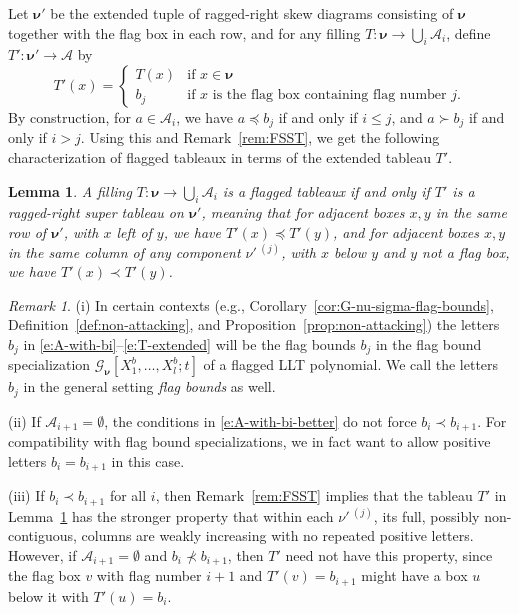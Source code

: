 \documentclass[12pt]{amsart}
\newtheorem{lemma}[thm]{Lemma}
\theoremstyle{definition}
\theoremstyle{remark}
\newtheorem{remark}[thm]{Remark}
\newcommand{\nubold}{{\boldsymbol \nu }}
\newcommand{\Acal}{{\mathcal A}}
\newcommand{\Gcal}{{\mathcal G}}
\newcommand{\sgngt}{\succ}
\newcommand{\sgnlt}{\prec}
\newcommand{\sgnle}{\preccurlyeq}
\begin{document}
Let $\nubold '$ be the extended tuple of ragged-right skew diagrams
consisting of $\nubold $ together with the flag box in each row, and
for any filling $T\colon \nubold \rightarrow \bigcup _{i}\Acal _{i}$,
define $T'\colon \nubold '\rightarrow \Acal $ by
\begin{equation}\label{e:T-extended}
T'(x)=\begin{cases}
T(x)&	\text{if $x \in \nubold$}\\
b_{j}&	\text{if $x$ is the flag box containing flag number $j$}.
\end{cases}
\end{equation}
By construction, for $a\in \Acal _{i}$, we have $a \sgnle b_{j}$ if
and only if $i\leq j$, and $a \sgngt b_{j}$ if and only if $i>j$.
Using this and Remark~\ref{rem:FSST}, we get the following
characterization of flagged tableaux in terms of the extended tableau
$T'$.

\begin{lemma}\label{lem:T-prime}
A filling $T\colon \nubold \rightarrow \bigcup _{i}\Acal _{i}$ is a
flagged tableaux if and only if $T'$ is a {\em ragged-right super
tableau} on $\nubold '$, meaning that for adjacent boxes $x, y$ in the
same row of $\nubold '$, with $x$ left of $y$, we have $T'(x) \sgnle
T'(y)$, and for adjacent boxes $x, y$ in the same column of any
component $\nu '\, ^{(j)}$, with $x$ below $y$ and $y$ not a flag box,
we have $T'(x) \sgnlt T'(y)$.
\end{lemma}

\begin{remark}\label{rem:T-prime}
(i) In certain contexts (e.g.,
Corollary~\ref{cor:G-nu-sigma-flag-bounds},
Definition~\ref{def:non-attacking}, and
Proposition~\ref{prop:non-attacking}) the letters $b_{j}$ in
\eqref{e:A-with-bi}--\eqref{e:T-extended} will be the flag bounds
$b_{j}$ in the flag bound specialization $\Gcal _{\nubold }[X^{b}_{1},
\ldots, X^{b}_{l}; t]$ of a flagged LLT polynomial.  We call the
letters $b_{j}$ in the general setting {\em flag bounds} as well.

(ii) If $\Acal _{i+1} = \emptyset $, the conditions in
\eqref{e:A-with-bi-better} do not force $b_{i} \sgnlt b_{i+1}$.  For
compatibility with flag bound specializations, we in fact want to
allow positive letters $b_{i} = b_{i+1}$ in this case.

(iii) If $b_{i} \sgnlt b_{i+1}$ for all $i$, then
Remark~\ref{rem:FSST} implies that the tableau $T'$ in
Lemma~\ref{lem:T-prime} has the stronger property that within each
$\nu '\, ^{(j)}$, its full, possibly non-contiguous, columns are
weakly increasing with no repeated positive letters.  However, if
$\Acal _{i+1} = \emptyset $ and $b_{i} \not \sgnlt b_{i+1}$, then $T'$
need not have this property, since the flag box $v$ with flag number
$i+1$ and $T'(v) = b_{i+1}$ might have a box $u$ below it with $T'(u)
= b_{i}$.
\end{remark}
\end{document}
